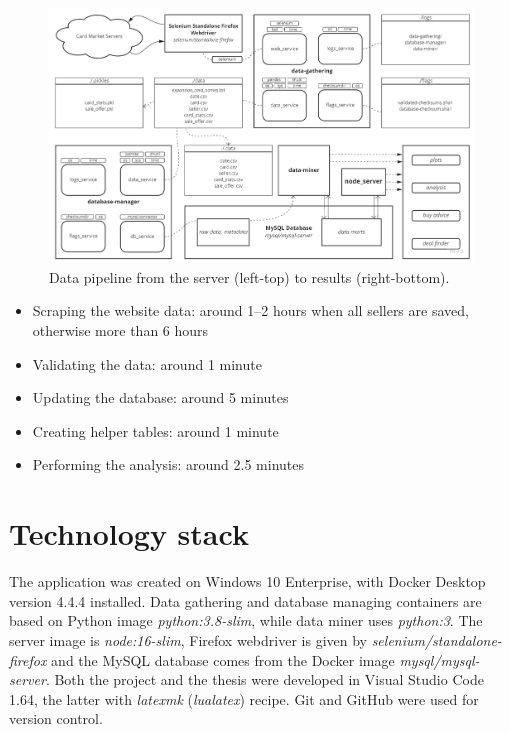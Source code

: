 \begin{figure}
    \centering
    \includegraphics[width=\textwidth]{figures/warehousing.jpg}
    \caption{Data pipeline from the server (left-top) to results (right-bottom).}
    \label{fig:pipeline}
\end{figure}

\begin{itemize}
    \item Scraping the website data: around 1--2 hours when all sellers are saved, otherwise more than 6 hours
    \item Validating the data: around 1 minute
    \item Updating the database: around 5 minutes
    \item Creating helper tables: around 1 minute
    \item Performing the analysis: around 2.5 minutes
\end{itemize}


\section{Technology stack}
The application was created on Windows 10 Enterprise, with Docker Desktop version 4.4.4 installed. Data gathering and database managing containers are based on Python image \textit{python:3.8-slim}, while data miner uses \textit{python:3}. The server image is \textit{node:16-slim}, Firefox webdriver is given by \textit{selenium/standalone-firefox} and the MySQL database comes from the Docker image \textit{mysql/mysql-server}. Both the project and the thesis were developed in Visual Studio Code 1.64, the latter with \textit{latexmk} (\textit{lualatex}) recipe. Git and GitHub were used for version control.
